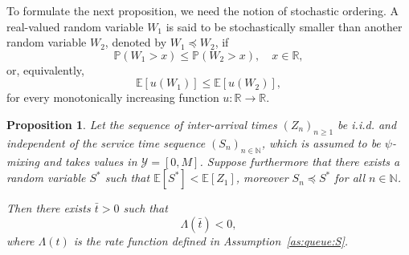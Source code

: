 \documentclass[a4paper,10pt]{article}
\newtheorem{proposition}[theorem]{Proposition}
\newcommand{\N}{\mathbb{N}}
\newcommand{\R}{\mathbb{R}}
\renewcommand{\P}{\mathbb{P}}
\newcommand{\E}{\mathbb{E}}
\begin{document}
To formulate the next proposition, we need the notion of stochastic ordering. A real-valued random variable $W_1$ is said to be stochastically smaller than another random variable $W_2$, denoted by $W_1 \preceq W_2$, if
$$
\P (W_1>x)\le \P (W_2>x),\quad x\in\R,
$$
or, equivalently,
$$
\E [u (W_1)]\le \E[u (W_2)],
$$
for every monotonically increasing function $u: \R\to\R$.
\begin{proposition}\label{prop:psi_mix}
	Let the sequence of inter-arrival times $(Z_n)_{n \ge 1}$ be i.i.d. and independent of the service time sequence $(S_n)_{n \in \mathbb{N}}$, which is assumed to be $\psi$-mixing and takes values in $\mathcal{Y} = [0, M]$. Suppose furthermore that there exists a random variable $S^*$ such that $\E [S^*]<\E [Z_1]$, moreover
	$S_n \preceq S^*$ for all $n \in \N$.
	
	Then there exists $\bar{t} > 0$ such that 
	$$
	\Lambda(\bar{t}) < 0,
	$$ 
	where $\Lambda(t)$ is the rate function defined in Assumption~\ref{as:queue:S}.
\end{proposition}
\end{document}
